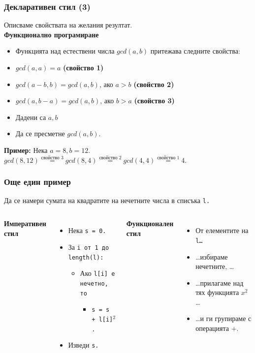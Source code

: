 \documentclass[alsotrans,beameroptions={aspectratio=169}]{beamerswitch}
\begin{document}
\begin{frame}
  \frametitle{Декларативен стил (3)}
  Описваме свойствата на желания резултат.\\[2ex]
  \textbf{Функционално програмиране}
  \begin{itemize}
  \item Функцията над естествени числа $gcd(a,b)$ притежава следните свойства:
  \item $gcd(a,a) = a$ \hspace{2ex}\textbf{(свойство 1)}
  \item $gcd(a-b,b) = gcd(a,b)$, ако $a > b$ \hspace{2ex}\textbf{(свойство 2)}
  \item $gcd(a,b-a) = gcd(a,b)$, ако $b > a$ \hspace{2ex}\textbf{(свойство 3)}
  \item Дадени са $a, b$
  \item Да се пресметне $gcd(a,b)$.
  \end{itemize}
  \pause
  \textbf{Пример:}
  Нека $a = 8, b = 12$.\\
  $gcd(8,12) \stackrel{\text{свойство 3}}= gcd(8,4) \stackrel{\text{свойство 2}}= gcd(4,4) \stackrel{\text{свойство 1}}= 4$.
\end{frame}

\begin{frame}
  \frametitle{Още един пример}

  Да се намери сумата на квадратите на нечетните числа в списъка \tt l.\\[2ex]
  \begin{columns}[t,onlytextwidth]
    \textbf{Императивен стил}
    \begin{itemize}
    \item Нека \tt{s = 0}.
    \item За \tt i от 1 до \tt{length(l)}:
      \begin{itemize}
      \item Ако \tt{l[i]} е нечетно, то
        \begin{itemize}
        \item \tt{s = s + l[i]$^2$}.
        \end{itemize}
      \end{itemize}
    \item Изведи \tt s.
    \end{itemize}

    \textbf{Функционален стил}
    \begin{itemize}
    \item От елементите на \tt l\ldots
    \item \ldots избираме нечетните, \ldots
    \item \ldots прилагаме над тях функцията $x^2$ \ldots
    \item \ldots и ги групираме с операцията $+$.
    \end{itemize}
  \end{columns}
\end{frame}
\end{document}
